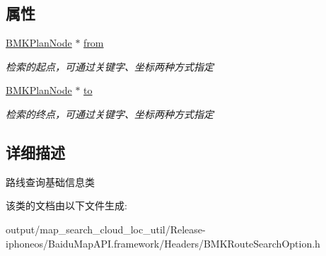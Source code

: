\subsection*{属性}
\begin{DoxyCompactItemize}
\item 
\hypertarget{interface_b_m_k_base_route_plan_option_afb4bc6a8468e1bf3dbb24c86abf06827}{}\hyperlink{interface_b_m_k_plan_node}{B\+M\+K\+Plan\+Node} $\ast$ \hyperlink{interface_b_m_k_base_route_plan_option_afb4bc6a8468e1bf3dbb24c86abf06827}{from}\label{interface_b_m_k_base_route_plan_option_afb4bc6a8468e1bf3dbb24c86abf06827}

\begin{DoxyCompactList}\small\item\em 检索的起点，可通过关键字、坐标两种方式指定 \end{DoxyCompactList}\item 
\hypertarget{interface_b_m_k_base_route_plan_option_a6a01852ca226bdc1f580bb4a10745c62}{}\hyperlink{interface_b_m_k_plan_node}{B\+M\+K\+Plan\+Node} $\ast$ \hyperlink{interface_b_m_k_base_route_plan_option_a6a01852ca226bdc1f580bb4a10745c62}{to}\label{interface_b_m_k_base_route_plan_option_a6a01852ca226bdc1f580bb4a10745c62}

\begin{DoxyCompactList}\small\item\em 检索的终点，可通过关键字、坐标两种方式指定 \end{DoxyCompactList}\end{DoxyCompactItemize}


\subsection{详细描述}
路线查询基础信息类 

该类的文档由以下文件生成\+:\begin{DoxyCompactItemize}
\item 
output/map\+\_\+search\+\_\+cloud\+\_\+loc\+\_\+util/\+Release-\/iphoneos/\+Baidu\+Map\+A\+P\+I.\+framework/\+Headers/B\+M\+K\+Route\+Search\+Option.\+h\end{DoxyCompactItemize}
